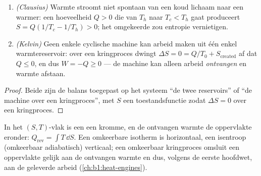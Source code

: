 \begin{proposition}\label{prop:b1:second-law-entropy:clausiuskelvin}
\begin{enumerate}
  \item \emph{(Clausius)} Warmte stroomt niet spontaan van een koud
        lichaam naar een warmer: een hoeveelheid $Q > 0$ die van $T_h$ naar
        $T_c < T_h$ gaat produceert $S = Q(1/T_c - 1/T_h) > 0$; het omgekeerde zou
        entropie vernietigen.
  \item \emph{(Kelvin)} Geen enkele cyclische machine kan arbeid maken uit één
        enkel warmtereservoir: over een kringproces dwingt $\Delta S = 0 = Q/T_0 + S_{\mathrm{created}}$
        af dat $Q \leq 0$, en dus $W = -Q \geq 0$ --- de machine kan alleen
        arbeid \emph{ontvangen} en warmte afstaan.
\end{enumerate}
\end{proposition}

\begin{proof}
Beide zijn de balans toegepast op het systeem ``de twee reservoirs'' of
``de machine over een kringproces'', met $S$ een toestandsfunctie zodat $\Delta S
= 0$ over een kringproces.
\end{proof}

\begin{definition}[Entropiediagram]\label{def:b1:second-law-entropy:TS}
In het $(S, T)$-vlak is een  een kromme, en de
ontvangen warmte de oppervlakte eronder: $Q_{\mathrm{rev}} = \int T\,\dd S$. Een
omkeerbare isotherm is horizontaal, een isentroop (omkeerbaar adiabatisch)
verticaal; een omkeerbaar kringproces omsluit een oppervlakte gelijk aan de ontvangen
warmte en dus, volgens de eerste hoofdwet, aan de geleverde arbeid
(\cref{ch:b1:heat-engines}).
\end{definition}

